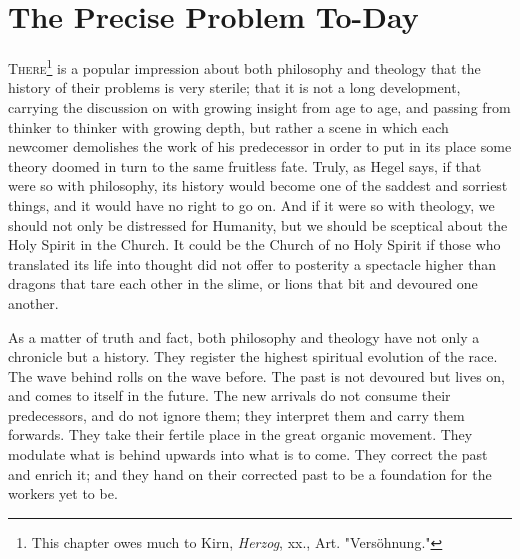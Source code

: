 \documentclass[12pt,a5paper,twoside,titlepage]{book}
\begin{document}
\chapter{The Precise Problem To-Day} 

\textsc{There}\footnote{This chapter owes much to Kirn, \textit{Herzog}, xx., Art. "Vers\"{o}hnung."} 
is a popular impression about both 
philosophy and theology that the history 
of their problems is very sterile; that it is 
not a long development, carrying the discussion 
on with growing insight from age to age, and 
passing from thinker to thinker with growing 
depth, but rather a scene in which each newcomer 
demolishes the work of his predecessor 
in order to put in its place some theory doomed 
in turn to the same fruitless fate. Truly, as 
Hegel says, if that were so with philosophy, 
its history would become one of the saddest 
and sorriest things, and it would have no 
right to go on. And if it were so with theology, 
we should not only be distressed for Humanity, 
but we should be sceptical about the Holy Spirit 
in the Church. It could be the Church of 
no Holy Spirit if those who translated its 
life into thought did not offer to posterity a 
spectacle higher than dragons that tare each 
other in the slime, or lions that bit and 
devoured one another. 

As a matter of truth and fact, both philosophy 
and theology have not only a chronicle but a 
history. They register the highest spiritual 
evolution of the race. The wave behind rolls on 
the wave before. The past is not devoured but 
lives on, and comes to itself in the future. The 
new arrivals do not consume their predecessors, 
and do not ignore them; they interpret them 
and carry them forwards. They take their 
fertile place in the great organic movement. 
They modulate what is behind upwards into 
what is to come. They correct the past and 
enrich it; and they hand on their corrected past 
to be a foundation for the workers yet to be. 
\end{document}
